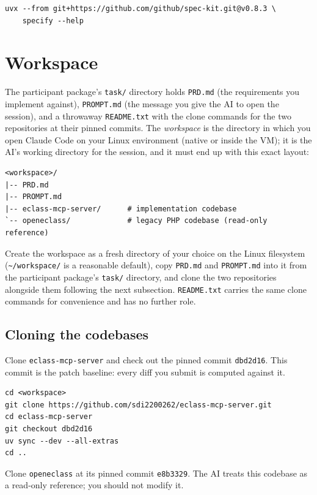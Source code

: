 \documentclass[11pt, a4paper]{article}
\begin{document}
\begin{verbatim}
uvx --from git+https://github.com/github/spec-kit.git@v0.8.3 \
    specify --help
\end{verbatim}

\section{Workspace}
\label{sec:workspace}

The participant package's \texttt{task/} directory holds \texttt{PRD.md} (the requirements you implement against), \texttt{PROMPT.md} (the message you give the AI to open the session), and a throwaway \texttt{README.txt} with the clone commands for the two repositories at their pinned commits. The \emph{workspace} is the directory in which you open Claude Code on your Linux environment (native or inside the VM); it is the AI's working directory for the session, and it must end up with this exact layout:

\begin{verbatim}
<workspace>/
|-- PRD.md
|-- PROMPT.md
|-- eclass-mcp-server/      # implementation codebase
`-- openeclass/             # legacy PHP codebase (read-only reference)
\end{verbatim}

Create the workspace as a fresh directory of your choice on the Linux filesystem (\texttt{\textasciitilde/workspace/} is a reasonable default), copy \texttt{PRD.md} and \texttt{PROMPT.md} into it from the participant package's \texttt{task/} directory, and clone the two repositories alongside them following the next subsection. \texttt{README.txt} carries the same clone commands for convenience and has no further role.

\subsection{Cloning the codebases}
\label{sec:cloning}

Clone \texttt{eclass-mcp-server} and check out the pinned commit \texttt{dbd2d16}. This commit is the patch baseline: every diff you submit is computed against it.

\begin{verbatim}
cd <workspace>
git clone https://github.com/sdi2200262/eclass-mcp-server.git
cd eclass-mcp-server
git checkout dbd2d16
uv sync --dev --all-extras
cd ..
\end{verbatim}

Clone \texttt{openeclass} at its pinned commit \texttt{e8b3329}. The AI treats this codebase as a read-only reference; you should not modify it.
\end{document}
